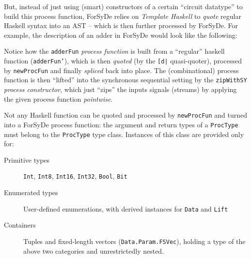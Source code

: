             But, instead of just using (smart) constructors of a certain ``circuit datatype'' to build
            this process function, ForSyDe relies on \emph{Template Haskell} to
            \emph{quote} regular Haskell syntax into an \ac{AST} -- which is then further processed by ForSyDe.
            For example, the description of an adder in ForSyDe would look like the following:


            Notice how the \texttt{adderFun} \emph{process function} is built from a ``regular'' haskell function
            (\texttt{adderFun'}), which is then \emph{quoted} (by the \texttt{[d|} quasi-quoter), processed by
            \texttt{newProcFun} and finally \emph{spliced} back into place.
            The (combinational) process function is then ``lifted'' into the synchronous sequential setting
            by the \texttt{zipWithSY} \emph{process constructor}, which just ``zips'' the inputs signals (streams)
            by applying the given process function \emph{pointwise}.

            Not any Haskell function can be quoted and processed by \texttt{newProcFun}
            and turned into a ForSyDe process function: the argument and return types of a \texttt{ProcType}
            must belong to the \texttt{ProcType} type class. Instances of this class are provided only for:

            \begin{description}
                \item[Primitive types] \texttt{Int}, \texttt{Int8}, \texttt{Int16}, \texttt{Int32}, \texttt{Bool}, \texttt{Bit}
                \item[Enumerated types] User-defined enumerations, with derived instances for \texttt{Data} and \texttt{Lift}
                \item[Containers] Tuples and fixed-length vectors (\texttt{Data.Param.FSVec}),
                    holding a type of the above two categories and unrestrictedly nested.
            \end{description}

